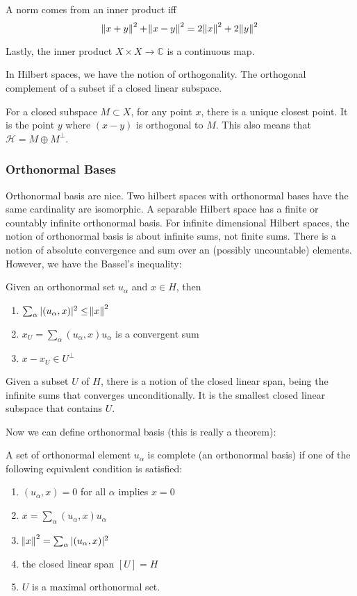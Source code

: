 \documentclass[main.tex]{subfiles}
\begin{document}
\begin{theorem}
A norm comes from an inner product iff 
$$
\norm{x + y}^2 + \norm{x - y}^2 = 2\norm{x}^2 + 2\norm{y}^2
$$
\end{theorem}

Lastly, the inner product $X \times X \rightarrow \mathbb{C}$ is a continuous map.

In Hilbert spaces, we have the notion of orthogonality. The orthogonal complement of a subset if a closed linear subspace.

\begin{theorem}[Projection]
For a closed subspace $M \subset X$, for any point $x$, there is a unique closest point. It is the point $y$ where $(x - y)$ is orthogonal to $M$. This also means that $\mathcal{H} = M \oplus M^\perp$.

\subsubsection{Orthonormal Bases}
Orthonormal basis are nice. Two hilbert spaces with orthonormal bases have the same cardinality are isomorphic. A separable Hilbert space has a finite or countably infinite orthonormal basis. For infinite dimensional Hilbert spaces, the notion of orthonormal basis is about infinite sums, not finite sums. There is a notion of absolute convergence and sum over an (possibly uncountable) elements. 
However, we have the Bassel's inequality:

\begin{theorem}
Given an orthonormal set $u_\alpha$ and $x \in H$, then \begin{enumerate}
    \item $\sum_{\alpha} |(u_\alpha, x)|^2 \leq \norm{x}^2$
    \item $x_U = \sum_\alpha (u_\alpha, x)u_\alpha$ is a convergent sum
    \item $x - x_U \in U^\perp$
\end{enumerate}
\end{theorem}

Given a subset $U$ of $H$, there is a notion of the closed linear span, being the infinite sums that converges unconditionally. It is the smallest closed linear subspace that contains $U$.

Now we can define orthonormal basis (this is really a theorem):

\begin{definition}
A set of orthonormal element $u_\alpha$ is complete (an orthonormal basis) if one of the following equivalent condition is satisfied:
\begin{enumerate}
    \item $(u_\alpha, x) = 0$ for all $\alpha$ implies $x = 0$
    \item $x = \sum_\alpha (u_\alpha, x) u_\alpha$
    \item $\norm{x}^2 = \sum_\alpha |(u_\alpha, x)|^2$
    \item the closed linear span $[U] = H$
    \item $U$ is a maximal orthonormal set.
\end{enumerate}
\end{definition}


\end{theorem}
\end{document}
